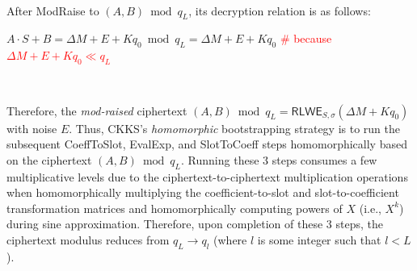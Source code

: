 $ $

After \textsf{ModRaise} to $(A, B) \bmod q_L$, its decryption relation is as follows:

$A\cdot S + B = \Delta M + E + Kq_0 \bmod q_L = \Delta M + E + Kq_0$ \textcolor{red}{\# because $\Delta M + E + Kq_0 \ll q_L$}

$ $

Therefore, the \textit{mod-raised} ciphertext $(A, B) \bmod q_L = \textsf{RLWE}_{S, \sigma}(\Delta M + Kq_0)$ with noise $E$. Thus, CKKS's \textit{homomorphic} bootstrapping strategy is to run the subsequent \textsf{CoeffToSlot}, \textsf{EvalExp}, and \textsf{SlotToCoeff} steps \textsf{homomorphically} based on the ciphertext $(A, B) \bmod q_L$. Running these 3 steps consumes a few multiplicative levels due to the ciphertext-to-ciphertext multiplication operations when homomorphically multiplying the coefficient-to-slot and slot-to-coefficient transformation matrices and homomorphically computing powers of $X$ (i.e., $X^k$) during sine approximation. Therefore, upon completion of these 3 steps, the ciphertext modulus reduces from $q_L \rightarrow q_l$ (where $l$ is some integer such that $l < L$).










